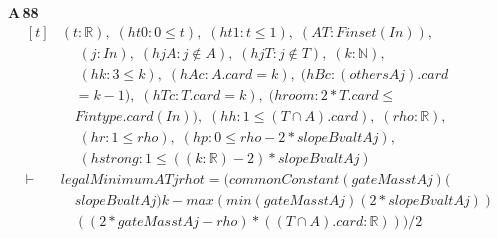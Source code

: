 \noindent\textbf{A\,88}\quad{}
{\footnotesize\[ \begin{aligned}[t]
&(\mathit{t} : \mathbb{R} ),\; (\mathit{ht0} : 0 \leq \mathit{t}),\; (\mathit{ht1} : \mathit{t} \leq 1),\; (\mathit{A} \mathit{T} : \mathit{Finset} (\mathit{I} \mathit{n})),\\
&\quad \; (\mathit{j} : \mathit{I} \mathit{n}),\; (\mathit{hjA} : \mathit{j} \notin \mathit{A}),\; (\mathit{hjT} : \mathit{j} \notin \mathit{T}),\; (\mathit{k} : \mathbb{N} ),\\
&\quad \; (\mathit{hk} : 3 \leq \mathit{k}),\; (\mathit{hAc} : \mathit{A}.\mathit{card}=\mathit{k}),\; (\mathit{hBc} : (\mathit{others} \mathit{A} \mathit{j}).\mathit{card}\\
&\quad =\mathit{k}-1),\; (\mathit{hTc} : \mathit{T}.\mathit{card}=\mathit{k}),\; (\mathit{hroom} : 2*\mathit{T}.\mathit{card} \leq\\
&\quad \mathit{Fintype}.\mathit{card} (\mathit{I} \mathit{n})),\; (\mathit{hh} : 1 \leq (\mathit{T} \cap \mathit{A}).\mathit{card}),\; (\mathit{rho} : \mathbb{R} ),\\
&\quad \; (\mathit{hr} : 1 \leq \mathit{rho}),\; (\mathit{hp} : 0 \leq \mathit{rho}-2*\mathit{slopeBval} \mathit{t} \mathit{A} \mathit{j}),\\
&\quad \; (\mathit{hstrong} : 1 \leq ((\mathit{k}:\mathbb{R} )-2)*\mathit{slopeBval} \mathit{t} \mathit{A} \mathit{j})\\
\vdash\;&\mathit{legalMinimum} \mathit{A} \mathit{T} \mathit{j} \mathit{rho} \mathit{t} = (\mathit{commonConstant} (\mathit{gateMass} \mathit{t} \mathit{A} \mathit{j}) (\\
&\quad \mathit{slopeBval} \mathit{t} \mathit{A} \mathit{j}) \mathit{k}- \mathit{max} (\mathit{min} (\mathit{gateMass} \mathit{t} \mathit{A} \mathit{j}) (2*\mathit{slopeBval} \mathit{t} \mathit{A} \mathit{j}))\\
&\quad ((2*\mathit{gateMass} \mathit{t} \mathit{A} \mathit{j}-\mathit{rho})*((\mathit{T} \cap \mathit{A}).\mathit{card}:\mathbb{R} )))/2
\end{aligned} \]}

